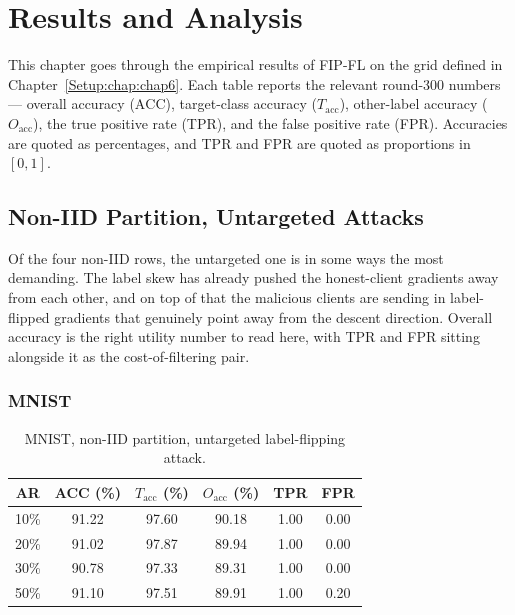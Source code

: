 \chapter{Results and Analysis}
\label{Results:chap:chap7}
\graphicspath{{16.Chapter7/Images/}}

This chapter goes through the empirical results of FIP-FL on the grid defined in Chapter~\ref{Setup:chap:chap6}. Each table reports the relevant round-300 numbers --- overall accuracy ($\text{ACC}$), target-class accuracy ($T_{\text{acc}}$), other-label accuracy ($O_{\text{acc}}$), the true positive rate (TPR), and the false positive rate (FPR). Accuracies are quoted as percentages, and TPR and FPR are quoted as proportions in $[0,1]$.

\section{Non-IID Partition, Untargeted Attacks}
\label{sec:res-nonIID-untarg}

Of the four non-IID rows, the untargeted one is in some ways the most demanding. The label skew has already pushed the honest-client gradients away from each other, and on top of that the malicious clients are sending in label-flipped gradients that genuinely point away from the descent direction. Overall accuracy is the right utility number to read here, with TPR and FPR sitting alongside it as the cost-of-filtering pair.

\subsection{MNIST}
\label{sec:res-nonIID-untarg-mnist}

\begin{table}[H]
\centering
\caption{MNIST, non-IID partition, untargeted label-flipping attack.}
\label{tab:res-nonIID-untarg-mnist}
\begin{tabular}{@{}cccccc@{}}
\toprule
\textbf{AR} & \textbf{ACC (\%)} & \textbf{$T_{\text{acc}}$ (\%)} & \textbf{$O_{\text{acc}}$ (\%)} & \textbf{TPR} & \textbf{FPR} \\
\midrule
10\% & 91.22 & 97.60 & 90.18 & 1.00 & 0.00 \\
20\% & 91.02 & 97.87 & 89.94 & 1.00 & 0.00 \\
30\% & 90.78 & 97.33 & 89.31 & 1.00 & 0.00 \\
50\% & 91.10 & 97.51 & 89.91 & 1.00 & 0.20 \\
\bottomrule
\end{tabular}
\end{table}

